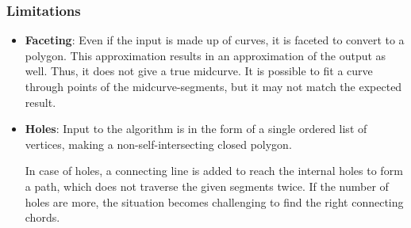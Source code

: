 \subsubsection{Limitations}

\begin{itemize}
\item \textbf{Faceting}: Even if the input is made up of curves, it is faceted to convert to a polygon. This approximation results in an approximation of the output as well. Thus, it does not give a true midcurve. It is possible to fit a curve through points of the midcurve-segments, but it may not match the expected result.
\item \textbf{Holes}: Input to the algorithm is in the form of a single ordered list of vertices, making a non-self-intersecting closed polygon.



In case of holes, a connecting line is added to reach the internal holes to form a path, which does not traverse the given segments twice. If the number of holes are more, the situation becomes challenging to find the right connecting chords.
\end{itemize}


